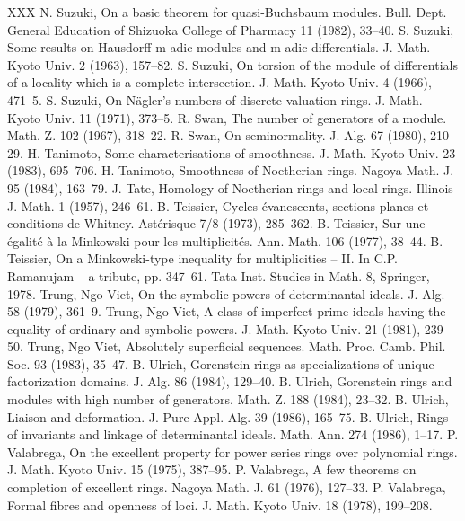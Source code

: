 \begin{thebibliography}{XXX}
 N. Suzuki, On a basic theorem for quasi-Buchsbaum modules. Bull. Dept. General Education of Shizuoka College of Pharmacy 11 (1982), 33--40.
 S. Suzuki, Some results on Hausdorff m-adic modules and m-adic differentials. J. Math. Kyoto Univ. 2 (1963), 157--82.
 S. Suzuki, On torsion of the module of differentials of a locality which is a complete intersection. J. Math. Kyoto Univ. 4 (1966), 471--5.
 S. Suzuki, On N\"agler's numbers of discrete valuation rings. J. Math. Kyoto Univ. 11 (1971), 373--5.
 R. Swan, The number of generators of a module. Math. Z. 102 (1967), 318--22.
 R. Swan, On seminormality. J. Alg. 67 (1980), 210--29.
 H. Tanimoto, Some characterisations of smoothness. J. Math. Kyoto Univ. 23 (1983), 695--706.
 H. Tanimoto, Smoothness of Noetherian rings. Nagoya Math. J. 95 (1984), 163--79.
 J. Tate, Homology of Noetherian rings and local rings. Illinois J. Math. 1 (1957), 246--61.
 B. Teissier, Cycles \'evanescents, sections planes et conditions de Whitney. Ast\'erisque 7/8 (1973), 285--362.
 B. Teissier, Sur une \'egalit\'e \`a la Minkowski pour les multiplicit\'es. Ann. Math. 106 (1977), 38--44.
 B. Teissier, On a Minkowski-type inequality for multiplicities -- II. In C.P. Ramanujam -- a tribute, pp. 347--61. Tata Inst. Studies in Math. 8, Springer, 1978.
 Trung, Ngo Viet, On the symbolic powers of determinantal ideals. J. Alg. 58 (1979), 361--9.
 Trung, Ngo Viet, A class of imperfect prime ideals having the equality of ordinary and symbolic powers. J. Math. Kyoto Univ. 21 (1981), 239--50.
 Trung, Ngo Viet, Absolutely superficial sequences. Math. Proc. Camb. Phil. Soc. 93 (1983), 35--47.
 B. Ulrich, Gorenstein rings as specializations of unique factorization domains. J. Alg. 86 (1984), 129--40.
 B. Ulrich, Gorenstein rings and modules with high number of generators. Math. Z. 188 (1984), 23--32.
 B. Ulrich, Liaison and deformation. J. Pure Appl. Alg. 39 (1986), 165--75.
 B. Ulrich, Rings of invariants and linkage of determinantal ideals. Math. Ann. 274 (1986), 1--17.
 P. Valabrega, On the excellent property for power series rings over polynomial rings. J. Math. Kyoto Univ. 15 (1975), 387--95.
 P. Valabrega, A few theorems on completion of excellent rings. Nagoya Math. J. 61 (1976), 127--33.
 P. Valabrega, Formal fibres and openness of loci. J. Math. Kyoto Univ. 18 (1978), 199--208.

\end{thebibliography}
